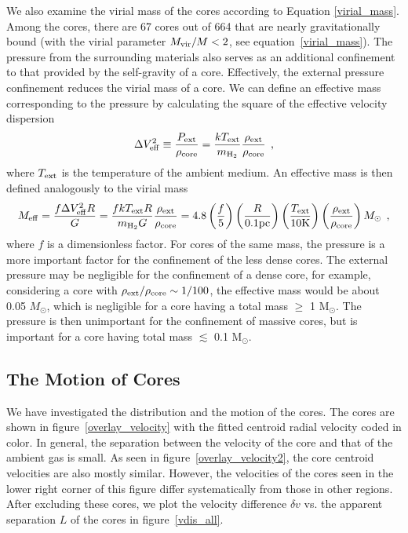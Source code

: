 \documentclass[12pt,preprint]{aastex}
\def\lc{\>\> ,}
\begin{document}
We also examine the virial mass of the cores according to Equation \ref{virial_mass}.
Among the cores, there are 67 cores out of 664 that are nearly gravitationally
bound (with the virial parameter $M_{\rm vir}/M<2$, see equation~\ref{virial_mass}).
The pressure from the surrounding materials also serves as an additional confinement to that provided by the self-gravity of a core.
Effectively, the external pressure confinement reduces the virial mass of a core. We can define an effective mass corresponding to the pressure
by calculating the square of the effective velocity dispersion
\begin{equation}
\Delta V_{\rm eff}^2\equiv \frac{P_{\rm ext}}{\rho_{\rm core}}=\frac{kT_{\rm ext}}{m_{\rm H_2}}\frac{\rho_{\rm ext}}{\rho_{\rm core}}\lc
\end{equation}
where $T_{\rm ext}$ is the temperature of the ambient medium. An effective mass is then defined analogously to the virial mass
\begin{equation}
M_{\rm eff}=\frac{f\Delta V_{\rm eff}^2 R}{G}=\frac{fkT_{\rm ext}R}{m_{\rm H_2}G}\frac{\rho_{\rm ext}}{\rho_{\rm core}}
=4.8\left(\frac{f}{5}\right)\left(\frac{R}{0.1\rm pc}\right)\left(\frac{T_{\rm ext}}{10\rm K}\right)\left(\frac{\rho_{\rm ext}}{\rho_{\rm core}}\right)M_{\odot}\lc
\end{equation}
where $f$ is a dimensionless factor. For cores of the same mass, the pressure is a more important factor for the confinement of the less dense cores.
The external pressure may be negligible for the confinement of a dense core, for example, considering a core with $\rho_{\rm ext}/\rho_{\rm core}\sim 1/100$, the effective mass would be about 0.05 $M_{\odot}$, which is negligible for a core having a total mass $\geq$ 1 M$_{\odot}$. The pressure is then unimportant for the confinement
of massive cores, but is important for a core having total mass $\lesssim$ 0.1 M$_{\odot}$.


\subsection{The Motion of Cores}

We have investigated the distribution and the motion of the cores. The cores are shown in figure~\ref{overlay_velocity} with the fitted centroid radial
velocity coded in color. In general, the separation between the velocity of the core and that of the ambient gas is small. As seen in figure~\ref{overlay_velocity2},
the core centroid velocities are also mostly similar.
However, the velocities of the cores seen in the lower right corner of this figure
differ systematically from those in other regions.
After excluding these cores, we plot the velocity difference $\delta v$ vs. the apparent separation $L$ of the cores in figure~\ref{vdis_all}.
\end{document}
